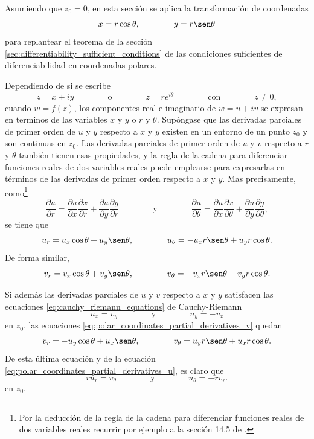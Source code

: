 \documentclass[a4paper]{report}
\begin{document}
Asumiendo que \(z_0=0\), en esta sección se aplica la transformación de coordenadas
\[
 x=r\cos\theta,\qquad\qquad y=r\sen\theta
\]
para replantear el teorema de la sección \ref{sec:differentiability_sufficient_conditions} de las condiciones suficientes de diferenciabilidad en coordenadas polares.

Dependiendo de si se escribe
\[
 z=x+iy\qquad\qquad\textrm{o}\qquad\qquad z=re^{i\theta}\qquad\qquad\textrm{con}\qquad\qquad z\neq0,
\]
cuando \(w=f(z)\), los componentes real e imaginario de \(w=u+iv\) se expresan en terminos de las variables \(x\) y \(y\) o \(r\) y \(\theta\). Supóngase que las derivadas parciales de primer orden de \(u\) y \(y\) respecto a \(x\) y \(y\) existen en un entorno de un punto \(z_0\) y son continuas en \(z_0\). Las derivadas parciales de primer orden de \(u\) y \(v\) respecto a \(r\) y \(\theta\) también tienen esas propiedades, y la regla de la cadena para diferenciar funciones reales de dos variables reales puede emplearse para expresarlas en términos de las derivadas de primer orden respecto a \(x\) y \(y\). Mas precisamente, como\footnote{Por la deducción de la regla de la cadena para diferenciar funciones reales de dos variables reales recurrir por ejemplo a la sección 14.5 de \cite{stewart2016multivariable}.}
\[
 \frac{\partial u}{\partial r}=\frac{\partial u}{\partial x}\frac{\partial x}{\partial r}+\frac{\partial u}{\partial y}\frac{\partial y}{\partial r}
 \qquad\qquad\textrm{y}\qquad\qquad
 \frac{\partial u}{\partial\theta}=\frac{\partial u}{\partial x}\frac{\partial x}{\partial\theta}+\frac{\partial u}{\partial y}\frac{\partial y}{\partial\theta},
\]
se tiene que 
\begin{equation}\label{eq:polar_coordinates_partial_derivatives_u}
 u_r=u_x\cos\theta+u_y\sen\theta,
 \qquad\qquad 
 u_\theta=-u_xr\sen\theta+u_yr\cos\theta.
\end{equation}
De forma similar,
\begin{equation}\label{eq:polar_coordinates_partial_derivatives_v}
 v_r=v_x\cos\theta+v_y\sen\theta,
 \qquad\qquad 
 v_\theta=-v_xr\sen\theta+v_yr\cos\theta.
\end{equation}

Si además las derivadas parciales de \(u\) y \(v\) respecto a \(x\) y \(y\) satisfacen las ecuaciones \ref{eq:cauchy_riemann_equations} de Cauchy-Riemann 
\[
 u_x=v_y
 \qquad\qquad\textrm{y}\qquad\qquad
 u_y=-v_x
\]
en \(z_0\), las ecuaciones \ref{eq:polar_coordinates_partial_derivatives_v} quedan
\[
 v_r=-u_y\cos\theta+u_x\sen\theta,
 \qquad\qquad 
 v_\theta=u_yr\sen\theta+u_xr\cos\theta.
\]
De esta última ecuación y de la ecuación \ref{eq:polar_coordinates_partial_derivatives_u}, es claro que 
\begin{equation}\label{eq:cauchy_riemann_equations_polar}
 ru_r=v_\theta 
 \qquad\qquad\textrm{y}\qquad\qquad
 u_\theta=-rv_r.
\end{equation}
en \(z_0\).
\end{document}
